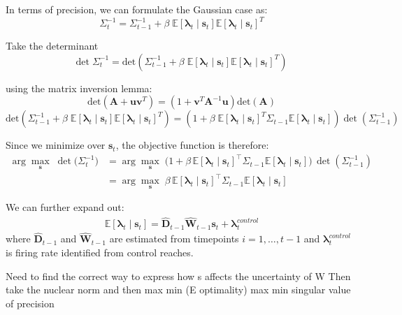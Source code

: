 \documentclass[11pt,letterpaper]{article} %
\begin{document}
In terms of precision, we can formulate the Gaussian case as:
\begin{equation*}
    \Sigma_{t}^{-1} = \Sigma_{t-1}^{-1} + \beta \; \mathbb{E}[\boldsymbol{\lambda} _t\mid \mathbf{s}_{t}] \mathbb{E}[\boldsymbol{\lambda} _t\mid \mathbf{s}_{t}]^T
\end{equation*}

Take the determinant
\[
    \text{det}\;\Sigma_{t}^{-1} = \text{det}(\Sigma_{t-1}^{-1} + \beta \; \mathbb{E}[\boldsymbol{\lambda} _t\mid \mathbf{s}_{t}] \mathbb{E}[\boldsymbol{\lambda} _t\mid \mathbf{s}_{t}]^T)
\]

using the matrix inversion lemma:
\[
    \text{det}(\mathbf{A} + \mathbf{uv}^T) = (1 + \mathbf{v}^T\mathbf{A}^{-1}\mathbf{u})\text{det}(\mathbf{A})
\]
\[
    \text{det}(\Sigma_{t-1}^{-1} + \beta \; \mathbb{E}[\boldsymbol{\lambda} _t\mid \mathbf{s}_{t}] \mathbb{E}[\boldsymbol{\lambda} _t\mid \mathbf{s}_{t}]^T) =  (1+ \beta \; \mathbb{E}[\boldsymbol{\lambda} _t\mid \mathbf{s}_{t}]^T \Sigma_{t-1} \mathbb{E}[\boldsymbol{\lambda} _t\mid \mathbf{s}_{t}])\det(\Sigma_{t-1}^{-1})
\]

Since we minimize over $\mathbf{s}_{t}$, the objective function is therefore:
\begin{align*}
    \arg\max_{\mathbf{s}}\; \det\big(\Sigma_{t}^{-1}\big)
    &= \arg\max_{\mathbf{s}}\;  \big(1+ \beta \,\mathbb{E}[\boldsymbol{\lambda} _t\mid \mathbf{s}_{t}]^{\top}\Sigma_{t-1}\mathbb{E}[\boldsymbol{\lambda} _t\mid \mathbf{s}_{t}]\big)\,\det(\Sigma_{t-1}^{-1})\\
    &= \arg\max_{\mathbf{s}}\; \beta \,\mathbb{E}[\boldsymbol{\lambda} _t\mid \mathbf{s}_{t}]^{\top}\Sigma_{t-1}\mathbb{E}[\boldsymbol{\lambda} _t\mid \mathbf{s}_{t}]
\end{align*}

We can further expand out:
\begin{align*}
    \mathbb{E}[\boldsymbol{\lambda} _t\mid \mathbf{s}_{t}]=\hat{\mathbf{D}}_{t-1}\hat{\mathbf{W}}_{t-1}\mathbf{s}_{t}+\boldsymbol{\lambda}_{t}^{control}
\end{align*}
where $\hat{\mathbf{D}}_{t-1}$ and $\hat{\mathbf{W}}_{t-1}$ are estimated from timepoints $i = 1,\ldots, t-1$
and $\boldsymbol{\lambda}_{t}^{control}$ is firing rate identified from control reaches.

Need to find the correct way to express how s affects the uncertainty of W
Then take the nuclear norm and then max min (E optimality)
max min singular value of precision 

\vspace{-1cm}
\end{document}
